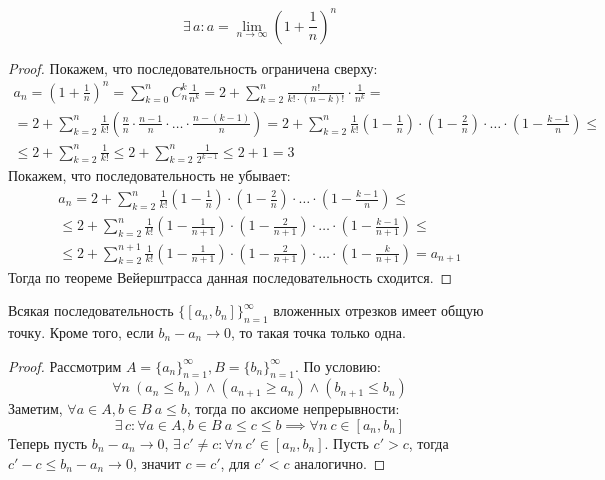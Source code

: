 \documentclass[12pt]{article}
\begin{document}
\begin{theorem}
	\[\exists\,a\colon a=\lim_{n\to\infty}\left(1+\frac{1}{n}\right)^n\]
	\begin{proof}
		Покажем, что последовательность ограничена сверху:
		\begin{multline*}
			a_n=\left(1+\frac{1}{n}\right)^n=\sum_{k=0}^{n}C_n^k\frac{1}{n^k}=2+\sum_{k=2}^{n}\frac{n!}{k!\cdot(n-k)!}\cdot\frac{1}{n^k}=\\
			=2+\sum_{k=2}^{n}\frac{1}{k!}\left(\frac{n}{n}\cdot\frac{n-1}{n}\cdot\ldots\cdot\frac{n-(k-1)}{n}\right)=2+\sum_{k=2}^{n}\frac{1}{k!}\left(1-\frac{1}{n}\right)\cdot\left(1-\frac{2}{n}\right)\cdot\ldots\cdot\left(1-\frac{k-1}{n}\right)\leqslant\\
			\leqslant2+\sum_{k=2}^{n}\frac{1}{k!}\leqslant2+\sum_{k=2}^{n}\frac{1}{2^{k-1}}\leqslant2+1=3
		\end{multline*}
		Покажем, что последовательность не убывает:
		\begin{multline*}
			a_n=2+\sum_{k=2}^{n}\frac{1}{k!}\left(1-\frac{1}{n}\right)\cdot\left(1-\frac{2}{n}\right)\cdot\ldots\cdot\left(1-\frac{k-1}{n}\right)\leqslant\\
			\leqslant2+\sum_{k=2}^{n}\frac{1}{k!}\left(1-\frac{1}{n+1}\right)\cdot\left(1-\frac{2}{n+1}\right)\cdot\ldots\cdot\left(1-\frac{k-1}{n+1}\right)\leqslant\\
			\leqslant2+\sum_{k=2}^{n+1}\frac{1}{k!}\left(1-\frac{1}{n+1}\right)\cdot\left(1-\frac{2}{n+1}\right)\cdot\ldots\cdot\left(1-\frac{k}{n+1}\right)=a_{n+1}
		\end{multline*}
		Тогда по теореме Вейерштрасса данная последовательность сходится.
	\end{proof}
\end{theorem}
\begin{theorem}
	Всякая последовательность $\{[a_n,b_n]\}_{n=1}^\infty$ вложенных
	отрезков имеет общую точку. Кроме того, если $b_n-a_n\to0$, то такая
	точка только одна.
	\begin{proof}
		Рассмотрим $A=\{a_n\}_{n=1}^\infty,B=\{b_n\}_{n=1}^\infty$. По условию:
		\[\forall n\ (a_n\leqslant b_n) \land (a_{n+1}\geqslant a_n) \land
		(b_{n+1}\leqslant b_n)\]		Заметим, $\forall a\in A, b\in
		B\ a\leqslant b$, тогда по аксиоме
		непрерывности:
		\[\exists\,c\colon \forall a\in A, b\in B\ a\leqslant c\leqslant
		b\implies \forall n\ c\in[a_n, b_n]\]		Теперь пусть $b_n-a_n\to0$,
		$\exists\,c'\neq c\colon \forall
		n\ c'\in [a_n,b_n]$. Пусть $c'>c$, тогда $c'-c\leqslant
		b_n-a_n\to0$, значит $c=c'$, для $c'<c$ аналогично.
	\end{proof}
\end{theorem}
\end{document}
